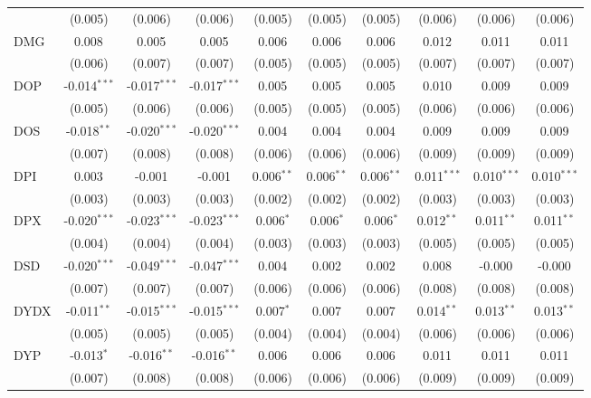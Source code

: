 \begin{table}[!htbp]
\begin{tabular}{@{\extracolsep{5pt}}lccccccccc}
  & (0.005) & (0.006) & (0.006) & (0.005) & (0.005) & (0.005) & (0.006) & (0.006) & (0.006) \\
 DMG & 0.008$^{}$ & 0.005$^{}$ & 0.005$^{}$ & 0.006$^{}$ & 0.006$^{}$ & 0.006$^{}$ & 0.012$^{}$ & 0.011$^{}$ & 0.011$^{}$ \\
  & (0.006) & (0.007) & (0.007) & (0.005) & (0.005) & (0.005) & (0.007) & (0.007) & (0.007) \\
 DOP & -0.014$^{***}$ & -0.017$^{***}$ & -0.017$^{***}$ & 0.005$^{}$ & 0.005$^{}$ & 0.005$^{}$ & 0.010$^{}$ & 0.009$^{}$ & 0.009$^{}$ \\
  & (0.005) & (0.006) & (0.006) & (0.005) & (0.005) & (0.005) & (0.006) & (0.006) & (0.006) \\
 DOS & -0.018$^{**}$ & -0.020$^{***}$ & -0.020$^{***}$ & 0.004$^{}$ & 0.004$^{}$ & 0.004$^{}$ & 0.009$^{}$ & 0.009$^{}$ & 0.009$^{}$ \\
  & (0.007) & (0.008) & (0.008) & (0.006) & (0.006) & (0.006) & (0.009) & (0.009) & (0.009) \\
 DPI & 0.003$^{}$ & -0.001$^{}$ & -0.001$^{}$ & 0.006$^{**}$ & 0.006$^{**}$ & 0.006$^{**}$ & 0.011$^{***}$ & 0.010$^{***}$ & 0.010$^{***}$ \\
  & (0.003) & (0.003) & (0.003) & (0.002) & (0.002) & (0.002) & (0.003) & (0.003) & (0.003) \\
 DPX & -0.020$^{***}$ & -0.023$^{***}$ & -0.023$^{***}$ & 0.006$^{*}$ & 0.006$^{*}$ & 0.006$^{*}$ & 0.012$^{**}$ & 0.011$^{**}$ & 0.011$^{**}$ \\
  & (0.004) & (0.004) & (0.004) & (0.003) & (0.003) & (0.003) & (0.005) & (0.005) & (0.005) \\
 DSD & -0.020$^{***}$ & -0.049$^{***}$ & -0.047$^{***}$ & 0.004$^{}$ & 0.002$^{}$ & 0.002$^{}$ & 0.008$^{}$ & -0.000$^{}$ & -0.000$^{}$ \\
  & (0.007) & (0.007) & (0.007) & (0.006) & (0.006) & (0.006) & (0.008) & (0.008) & (0.008) \\
 DYDX & -0.011$^{**}$ & -0.015$^{***}$ & -0.015$^{***}$ & 0.007$^{*}$ & 0.007$^{}$ & 0.007$^{}$ & 0.014$^{**}$ & 0.013$^{**}$ & 0.013$^{**}$ \\
  & (0.005) & (0.005) & (0.005) & (0.004) & (0.004) & (0.004) & (0.006) & (0.006) & (0.006) \\
 DYP & -0.013$^{*}$ & -0.016$^{**}$ & -0.016$^{**}$ & 0.006$^{}$ & 0.006$^{}$ & 0.006$^{}$ & 0.011$^{}$ & 0.011$^{}$ & 0.011$^{}$ \\
  & (0.007) & (0.008) & (0.008) & (0.006) & (0.006) & (0.006) & (0.009) & (0.009) & (0.009) \\

\end{tabular}
\end{table}
